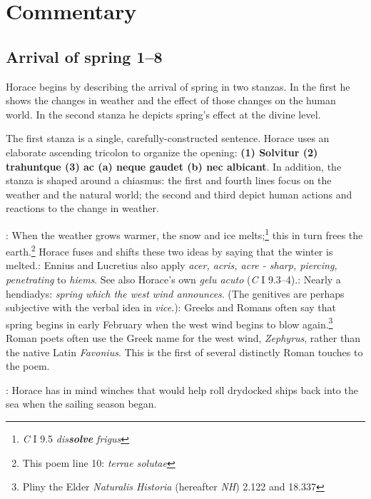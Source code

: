 \chapter*{Commentary}

\section*{Arrival of spring 1--8}

Horace begins by describing the arrival of spring in two stanzas.  In the first he shows the changes in weather and the effect of those changes on the human world.  In the second stanza he depicts spring's effect at the divine level.


The first stanza is a single, carefully-constructed sentence.  Horace uses an elaborate ascending tricolon to organize the opening: \textbf{(1) Solvitur \lips (2) trahuntque \lips (3) ac (a) neque \lips gaudet \lips (b) nec \lips albicant}.  In addition, the stanza is shaped around a chiasmus: the first and fourth lines focus on the weather and the natural world; the second and third depict human actions and reactions to the change in weather. 


: When the weather grows warmer, the snow and ice melts;\footnote{\textit{C} I 9.5 \textit{dis\textbf{solve} frigus}} this in turn frees the earth.\footnote{This poem line 10: \textit{terrae \lips solutae}}  Horace fuses and shifts these two ideas by saying that the winter is melted.\indent{}: Ennius and Lucretius also apply \textit{acer, acris, acre - sharp, piercing, penetrating} to \textit{hiems}. See also Horace's own \textit{gelu \lips acuto} (\textit{C} I 9.3--4).\indent{}: Nearly a hendiadys: \textit{spring which the west wind announces}.  (The genitives are perhaps subjective with the verbal idea in \textit{vice}.)\indent{}: Greeks and Romans often say that spring begins in early February when the west wind begins to blow again.\footnote{Pliny the Elder \textit{Naturalis Historia} (hereafter \textit{NH}) 2.122 and 18.337}  Roman poets often use the Greek name for the west wind, \textit{Zephyrus}, rather than the native Latin \textit{Favonius}.  This is the first of several distinctly Roman touches to the poem.


: Horace has in mind winches that would help roll drydocked ships back into the sea when the sailing season began.

